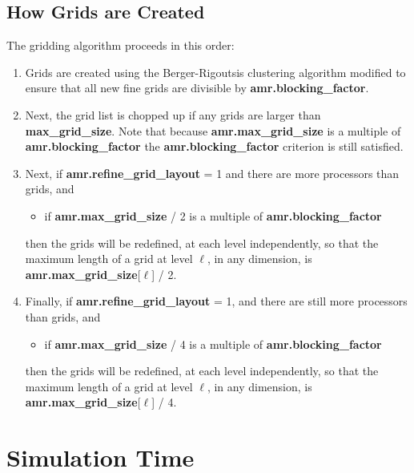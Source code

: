 \subsection{How Grids are Created}

\noindent The gridding algorithm proceeds in this order:

\begin{enumerate}
\item Grids are created using the Berger-Rigoutsis clustering algorithm 
modified to ensure that all new fine grids are divisible by {\bf amr.blocking\_factor}.

\item Next, the grid list is chopped up if any grids are larger than {\bf max\_grid\_size}.
Note that because {\bf amr.max\_grid\_size} is a multiple of {\bf amr.blocking\_factor}
the {\bf amr.blocking\_factor} criterion is still satisfied. 

\item Next, if {\bf amr.refine\_grid\_layout} = 1 and there are more processors than grids, and
\begin{itemize}
\item if {\bf amr.max\_grid\_size} / 2 is a multiple of {\bf amr.blocking\_factor}
\end{itemize}
then the grids will be redefined, at each level independently, so that the 
maximum length of a grid at level $\ell$, in any dimension, 
is {\bf amr.max\_grid\_size}[$\ell$] / 2.  

\item Finally, if {\bf amr.refine\_grid\_layout} = 1,  and there are still more processors
than grids, and 
\begin{itemize}
\item if {\bf amr.max\_grid\_size} / 4 is a multiple of {\bf amr.blocking\_factor}
\end{itemize}
then the grids will be redefined, at each level independently, so that the 
maximum length of a grid at level $\ell$, in any dimension, 
is {\bf amr.max\_grid\_size}[$\ell$] / 4.


\end{enumerate}

\section{Simulation Time}

